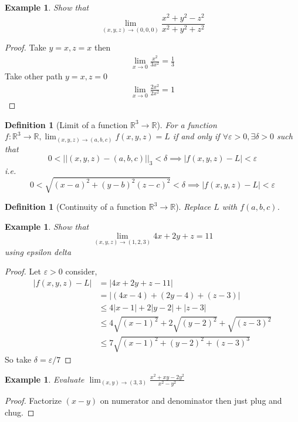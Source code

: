 \documentclass[oneside,11pt,pdftex]{book}%
\numberwithin{equation}{section}
\newtheorem{example}[theorem]{Example}
\newtheorem{definition}[theorem]{Definition}
\numberwithin{section}{chapter}
\numberwithin{equation}{chapter}
\newcommand{\R}{\mathbb{R}}
\begin{document}
\begin{example}
	Show that \[ \lim_{(x,y,z)\rightarrow (0,0,0)} \frac{x^2+y^2-z^2}{x^2+y^2+z^2}\]
\end{example}
\begin{proof}
	Take $ y=x,z=x$ then 
	\begin{align*}
		\lim_{x \rightarrow 0} \frac{x^2}{3x^2}=\frac{1}{3}
	\end{align*}
	Take other path $ y=x,z=0 $
	\begin{align*}
		\lim_{x \rightarrow 0} \frac{2x^2}{2x^2}=1
	\end{align*}
\end{proof}

\begin{definition}[Limit of a function $ \R^3 \rightarrow \R  $]
	For a function $ f: \R^3 \rightarrow \R , \lim_{(x,y,z)\rightarrow (a,b,c)}f(x,y,z) =L $ if and only if $ \forall \varepsilon>0, \exists \delta >0  $ such that 
	\[ 0<||(x,y,z)-(a,b,c)||_3 < \delta \implies |f(x,y,z)-L|< \varepsilon\]
	i.e. \[ 0< \sqrt{(x-a)^2+(y-b)^2(z-c)^2}<\delta \implies |f(x,y,z)-L|<\varepsilon \]
\end{definition}

\begin{definition}[Continuity of a function $ \R^3 \rightarrow \R $]
Replace $ L $ with $ f(a,b,c) $.
\end{definition}

\begin{example}
	Show that \[ \lim_{(x,y,z) \rightarrow (1,2,3)} 4x+2y+z=11 \] using epsilon delta
\end{example}
\begin{proof}
	Let $ \varepsilon>0 $ consider,
	\begin{align*}
		|f(x,y,z)-L|&=|4x+2y+z-11|\\
		&= |(4x-4)+(2y-4)+(z-3)|\\
		&\leq 4|x-1|+2|y-2|+|z-3|\\
		& \leq 4 \sqrt{(x-1)^2}+2 \sqrt{(y-2)^2}+ \sqrt{(z-3)^2}\\
		&\leq 7 \sqrt{(x-1)^2 +(y-2)^2 +(z-3)^3}
	\end{align*}
So take $ \delta=\varepsilon/7 $
\end{proof}

\begin{example}
	Evaluate $ \lim_{(x,y)\rightarrow (3,3)} \frac{x^2+xy-2y^2}{x^2-y^2}$
\end{example}
\begin{proof}
	Factorize $ (x-y) $ on numerator and denominator then just plug and chug.
\end{proof}
\end{document}
